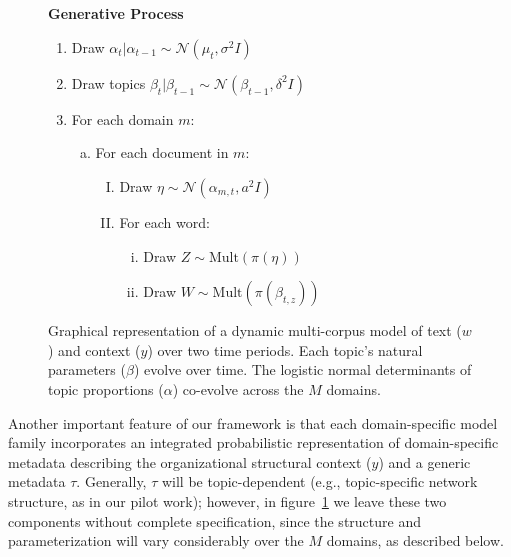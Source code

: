 \begin{figure}
\begin{center}
\end{center}
\vspace{-.3cm}
\caption{Graphical representation of a dynamic multi-corpus model of text ($w$) and context ($y$) over two time periods. Each topic's natural parameters ($\beta$) evolve over time. The logistic normal determinants of topic proportions ($\alpha$) co-evolve across the $M$ domains.}
\vspace{-.5cm}

\label{plates}
~\\~\\

{\bf Generative Process}
\begin{enumerate}
\item Draw $\alpha_t | \alpha_{t-1} \sim  \mathcal{N}(\mu_t,\sigma^2I)$
\item Draw topics $\beta_t|\beta_{t-1}\sim \mathcal{N}\left(\beta_{t-1},\delta^2I \right)$
\item For each domain $m$:
\begin{enumerate}[a.]
\item For each document in $m$:
\begin{enumerate}[I.]
\item  Draw $\eta \sim \mathcal{N}\left(\alpha_{m,t},a^2I \right)$
\item For each word:
\begin{enumerate}[i.]
\item Draw $Z \sim \text{Mult}(\pi(\eta))$
\item Draw $W \sim \text{Mult}(\pi(\beta_{t,z}))$
\end{enumerate}


\end{enumerate}
\end{enumerate}
\end{enumerate}

\vspace{-1.6cm}
\end{figure}

Another important feature of our framework is that each
domain-specific model family incorporates an integrated probabilistic
representation of domain-specific metadata describing the
organizational structural context ($y$) and a generic metadata
$\tau$. Generally, $\tau$ will be topic-dependent (e.g.,
topic-specific network structure, as in our pilot work); however, in
figure~\ref{plates} we leave these two components without complete
specification, since the structure and parameterization
will vary considerably over the $M$ domains, as described below.

